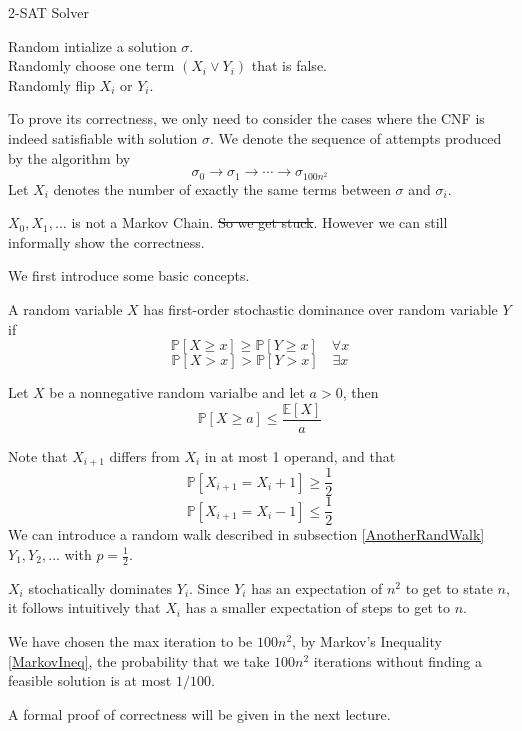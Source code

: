 \begin{algorithm}
    \caption{2-SAT Solver}
    Random intialize a solution $\sigma$.\\
    {
        {
            \KwRet{$\sigma$}
        }
        \Else
        {
            Randomly choose one term $(X_i \vee Y_i)$ that is false.\\
            Randomly flip $X_i$ or $Y_i$.
        }
    }
\end{algorithm}

To prove its correctness, we only need to consider the cases where the CNF is indeed satisfiable with solution $\sigma$. We denote the sequence of attempts produced by the algorithm by
\[ \sigma_0 \to \sigma_1 \to \cdots \to \sigma_{100n^2} \]
Let $X_i$ denotes the number of exactly the same terms between $\sigma$ and $\sigma_i$.

$X_0, X_1, \dots$ is not a Markov Chain. \sout{So we get stuck}. However we can still informally show the correctness.

We first introduce some basic concepts.
\begin{definition}
    A random variable $X$ has first-order stochastic dominance over random variable $Y$ if
    \[ \mathbb{P}[X \ge x] \ge \mathbb{P}[Y \ge x] \quad \forall x \]
    \[ \mathbb{P}[X > x] > \mathbb{P}[Y > x] \quad \exists x \]
\end{definition}
\begin{theorem}\label{MarkovIneq}
    Let $X$ be a nonnegative random varialbe and let $a > 0$, then
    \[ \mathbb{P}[X \ge a] \le \frac{\mathbb{E}[X]}{a} \]
\end{theorem}
\begin{sketchproof}
    Note that $X_{i+1}$ differs from $X_i$ in at most 1 operand, and that
    \[ \mathbb{P}[X_{i+1} = X_i + 1] \ge \frac{1}{2} \]
    \[ \mathbb{P}[X_{i+1} = X_i - 1] \le \frac{1}{2} \]
    We can introduce a random walk described in subsection \ref{AnotherRandWalk} $Y_1, Y_2, \dots$ with $p = \frac{1}{2}$.

    $X_i$ stochatically dominates $Y_i$. Since $Y_i$ has an expectation of $n^2$ to get to state $n$, it follows intuitively that $X_i$ has a smaller expectation of steps to get to $n$.

    We have chosen the max iteration to be $100n^2$, by Markov's Inequality \ref{MarkovIneq}, the probability that we take $100n^2$ iterations without finding a feasible solution is at most $1/100$.
\end{sketchproof}
\begin{remark}
    A formal proof of correctness will be given in the next lecture.
\end{remark}